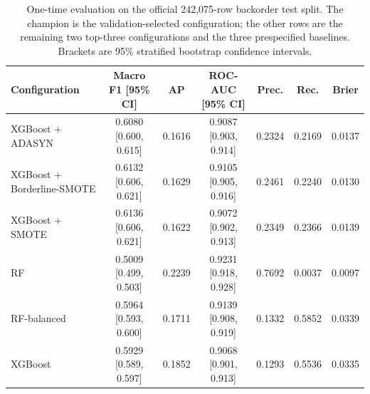 \begin{table}[H]
\centering
\caption{One-time evaluation on the official 242{,}075-row backorder test split.
The champion is the validation-selected configuration; the other rows are the remaining
two top-three configurations and the three prespecified baselines. Brackets are 95\% stratified bootstrap
confidence intervals.}
\label{tab:bo-champion}
\footnotesize
\begin{tabular}{lcccccc}
\toprule
Configuration & Macro F1 [95\% CI] & AP & ROC-AUC [95\% CI] & Prec. & Rec. & Brier \\
\midrule
XGBoost + ADASYN & 0.6080 [0.600, 0.615] & 0.1616 & 0.9087 [0.903, 0.914] & 0.2324 & 0.2169 & 0.0137 \\
XGBoost + Borderline-SMOTE & 0.6132 [0.606, 0.621] & 0.1629 & 0.9105 [0.905, 0.916] & 0.2461 & 0.2240 & 0.0130 \\
XGBoost + SMOTE & 0.6136 [0.606, 0.621] & 0.1622 & 0.9072 [0.902, 0.913] & 0.2349 & 0.2366 & 0.0139 \\
RF & 0.5009 [0.499, 0.503] & 0.2239 & 0.9231 [0.918, 0.928] & 0.7692 & 0.0037 & 0.0097 \\
RF-balanced & 0.5964 [0.593, 0.600] & 0.1711 & 0.9139 [0.908, 0.919] & 0.1332 & 0.5852 & 0.0339 \\
XGBoost & 0.5929 [0.589, 0.597] & 0.1852 & 0.9068 [0.901, 0.913] & 0.1293 & 0.5536 & 0.0335 \\
\bottomrule
\end{tabular}
\end{table}
